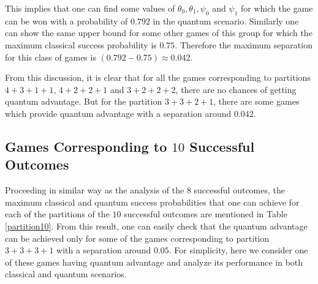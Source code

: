 \documentclass[]{svjour3}
\begin{document}
This implies that one can find some values of $\theta_0, \theta_1, \psi_0$ and $\psi_1$ for which the game can be won with a probability of $0.792$ in the quantum scenario. Similarly one can show the same upper bound for some other games of this group for which the maximum classical success probability is $0.75$.
Therefore the maximum separation for this class of games is $(0.792 - 0.75) \approx 0.042$.


From this discussion, it is clear that for all the games corresponding to partitions $4+3+1+1$, $4+2+2+1$ and $3+2+2+2$, there are no chances of getting quantum advantage. But for the partition $3+3+2+1$, there are some games which provide quantum advantage with a separation around $0.042$.





\subsection{Games Corresponding to $10$ Successful Outcomes}

Proceeding in similar way as the analysis of the $8$ successful outcomes, the maximum classical and quantum success probabilities that one can achieve for each of the partitions of the $10$ successful outcomes are mentioned in Table \ref{partition10}. From this result, one can easily check that the quantum advantage can be achieved only for some of the games corresponding to partition $3+3+3+1$ with a separation around $0.05$. For simplicity, here we consider one of these games having quantum advantage and analyze its performance in both classical and quantum scenarios.
\end{document}
